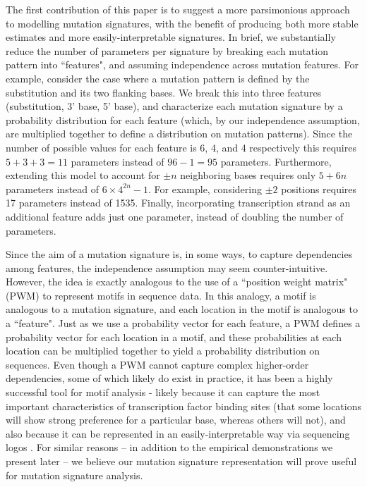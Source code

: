\documentclass[10pt,letterpaper]{article}
\begin{document}


The first contribution of this paper is to suggest
a more parsimonious approach to modelling 
mutation signatures, with the benefit of producing both more stable estimates and more easily-interpretable signatures.
In brief, we substantially reduce the number of parameters
per signature by breaking each mutation pattern into 
``features", and assuming independence
across mutation features. For example, consider
the case where a mutation pattern is defined by the substitution and its two flanking bases. We break this into three features (substitution,
3' base, 5' base), and characterize each mutation
signature by a probability distribution for each feature
(which, by our independence assumption, are multiplied
together to define a distribution on mutation patterns). Since the number of possible values for each feature is 6, 4, and 4 respectively this requires $5+3+3=11$ parameters instead of $96-1=95$ parameters. Furthermore, extending this model to account for $\pm n$ neighboring bases requires only $5 + 6n$ parameters instead of $6 \times 4^{2n} - 1$. For example,
 considering $\pm 2$ positions requires 17 parameters
 instead of 1535. Finally, incorporating
transcription strand as an additional feature adds just one parameter, instead of doubling the number of parameters.

Since the aim of a mutation signature is, in some ways, to capture dependencies among features, the independence assumption may seem counter-intuitive. However, the
idea is exactly analogous to the use of a ``position weight matrix" (PWM) to represent motifs in sequence data. In this
analogy, a motif is analogous to a mutation signature, and each location in the motif is analogous to a ``feature". Just as we use a probability vector for each feature, a PWM defines a probability vector for each location in a motif,
and these probabilities at each location can be multiplied together to yield a probability
distribution on sequences.
Even though a PWM cannot capture complex 
higher-order dependencies, some of which likely do exist in practice, it has been a highly successful tool for motif
analysis - likely because it can capture the most important characteristics of transcription factor binding sites 
(that some locations will show strong preference for a particular base, whereas others will not), and also
because it can be represented in an easily-interpretable way via sequencing logos \cite{pmid2172928}.
For similar reasons -- in addition to the empirical
demonstrations we present later -- we believe our mutation signature representation will prove useful for mutation signature analysis. 
\end{document}
